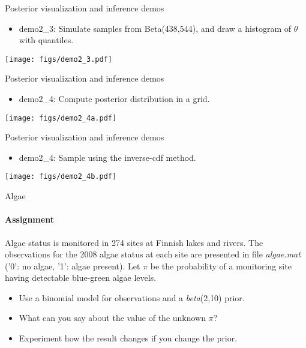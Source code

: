 \documentclass[english,t]{beamer}
\begin{document}

\begin{frame}{Posterior visualization and inference demos}

  \begin{itemize}
  \item demo2\_3: Simulate samples from Beta(438,544), and draw
    a histogram of $\theta$ with quantiles.
  \end{itemize}
  \vspace{-\baselineskip}
  \begin{center}
    \texttt{[image: figs/demo2\_3.pdf]}
  \end{center}
\end{frame}

\begin{frame}{Posterior visualization and inference demos}

  \begin{itemize}
  \item demo2\_4: Compute posterior distribution in a grid.
  \end{itemize}
  \texttt{[image: figs/demo2\_4a.pdf]}
\end{frame}

\begin{frame}{Posterior visualization and inference demos}

  \begin{itemize}
  \item demo2\_4: Sample using the inverse-cdf method.
  \end{itemize}
  \texttt{[image: figs/demo2\_4b.pdf]}
\end{frame}

\begin{frame}{Algae}
  \framesubtitle{Assignment}

  Algae status is monitored in 274 sites at Finnish lakes and rivers. 
  The observations for the 2008 algae status at each site are presented
  in file \emph{algae.mat} ('0': no algae, '1': algae present). 
  Let $\pi$ be the probability of a monitoring site having detectable
  blue-green algae levels. 

  \begin{itemize}
  \item Use a binomial model for observations and a \emph{beta}(2,10) prior.
  \item What can you say about the value of the unknown $\pi$?
  \item Experiment how the result changes if you change the prior.
  \end{itemize}

\end{frame}
\end{document}
